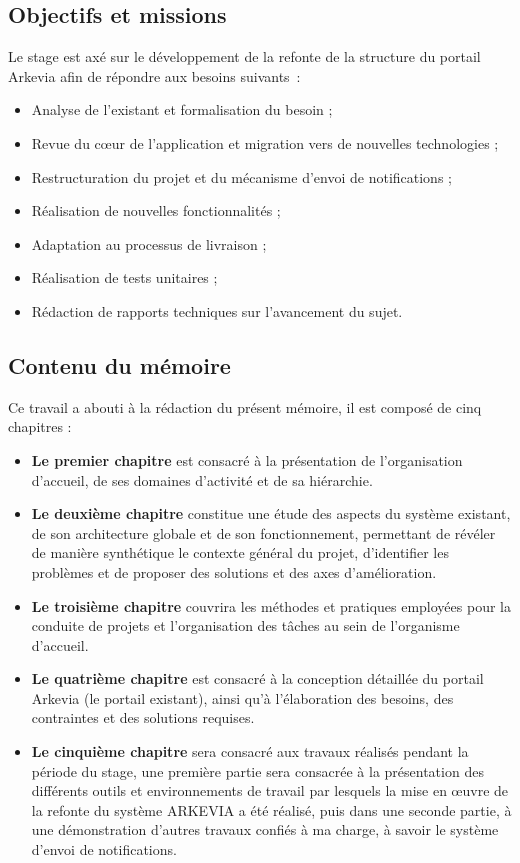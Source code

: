 \subsection*{Objectifs et missions}
Le stage est axé sur le développement de la refonte de la structure du portail Arkevia afin de répondre aux besoins suivants :
\begin{itemize}
    \item Analyse de l’existant et formalisation du besoin ;
    \item Revue du cœur de l’application et migration vers de nouvelles technologies ;
    \item Restructuration du projet et du mécanisme d'envoi de notifications ;
    \item Réalisation de nouvelles fonctionnalités ;
    \item Adaptation au processus de livraison ;
    \item Réalisation de tests unitaires ;
    \item Rédaction de rapports techniques sur l’avancement du sujet.
\end{itemize}

\subsection*{Contenu du mémoire}
Ce travail a abouti à la rédaction du présent mémoire, il est composé de cinq chapitres : 
\begin{itemize}
    \item \textbf{Le premier chapitre} est consacré à la présentation de l'organisation d'accueil, de ses domaines d'activité et de sa hiérarchie.
    \item \textbf{Le deuxième chapitre} constitue une étude des aspects du système existant, de son architecture globale et de son fonctionnement, permettant de révéler de manière synthétique le contexte général du projet, d'identifier les problèmes et de proposer des solutions et des axes d'amélioration.
    \item \textbf{Le troisième chapitre} couvrira les méthodes et pratiques employées pour la conduite de projets et l'organisation des tâches au sein de l'organisme d'accueil.
    \item \textbf{Le quatrième chapitre} est consacré à la conception détaillée du portail Arkevia (le portail existant), ainsi qu'à l'élaboration des besoins, des contraintes et des solutions requises.
    \item \textbf{Le cinquième chapitre} sera consacré aux travaux réalisés pendant la période du stage, une première partie sera consacrée à la présentation des différents outils et environnements de travail par lesquels la mise en œuvre de la refonte du système ARKEVIA a été réalisé, puis dans une seconde partie, à une démonstration d'autres travaux confiés à ma charge, à savoir le système d’envoi de notifications.
\end{itemize}
